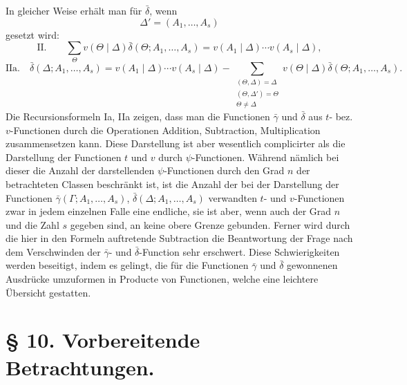 In gleicher Weise erhält man für $\bar\delta$, wenn
\[
 \Delta'=(A_1,\ldots,A_s)
\]
gesetzt wird:
\[
\text{II.}\qquad
 \sum_{\Theta}v(\Theta\mid\Delta)\bar\delta(\Theta;A_1,\ldots,A_s)
 =v(A_1\mid\Delta)\cdots v(A_s\mid\Delta),
\]
\[
\text{IIa.}\quad
 \bar\delta(\Delta;A_1,\ldots,A_s)=v(A_1\mid\Delta)\cdots v(A_s\mid\Delta)
 -\sum_{\substack{(\Theta,\Delta)=\Delta\\(\Theta,\Delta')=\Theta\\\Theta\ne\Delta}}
 v(\Theta\mid\Delta)\bar\delta(\Theta;A_1,\ldots,A_s).
\]
Die Recursionsformeln Ia, IIa zeigen, dass man die Functionen $\bar\gamma$ und $\bar\delta$ aus $t$- bez. $v$-Functionen durch die Operationen Addition, Subtraction, Multiplication zusammensetzen kann. Diese Darstellung ist aber wesentlich complicirter als die Darstellung der Functionen $t$ und $v$ durch $\psi$-Functionen. Während nämlich bei dieser die Anzahl der darstellenden $\psi$-Functionen durch den Grad $n$ der betrachteten Classen beschränkt ist, ist die Anzahl der bei der Darstellung der Functionen $\bar\gamma(\Gamma;A_1,\ldots,A_s)$, $\bar\delta(\Delta;A_1,\ldots,A_s)$ verwandten $t$- und $v$-Functionen zwar in jedem einzelnen Falle eine endliche, sie ist aber, wenn auch der Grad $n$ und die Zahl $s$ gegeben sind, an keine obere Grenze gebunden. Ferner wird durch die hier in den Formeln auftretende Subtraction die Beantwortung der Frage nach dem Verschwinden der $\bar\gamma$- und $\bar\delta$-Function sehr erschwert. Diese Schwierigkeiten werden beseitigt, indem es gelingt, die für die Functionen $\bar\gamma$ und $\bar\delta$ gewonnenen Ausdrücke umzuformen in Producte von Functionen, welche eine leichtere Übersicht gestatten.

\section*{§ 10. Vorbereitende Betrachtungen.}

